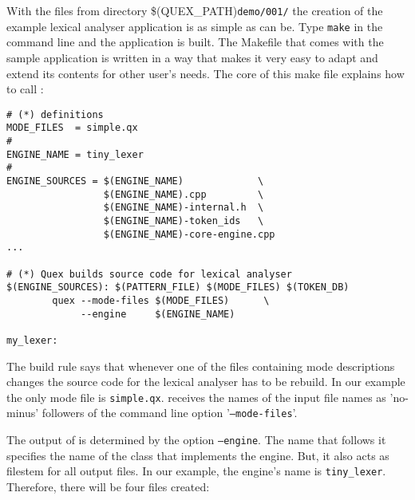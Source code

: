 With the files from directory \$(QUEX\_PATH){\tt demo/001/} the creation of the
example lexical analyser application is as simple as can be. Type {\tt make}
in the command line and the application is built. The Makefile that comes with
the sample application is written in a way that makes it very easy to adapt
and extend its contents for other user's needs. The core of this make file 
explains how to call {\quex}:

\begin{samepage}
\begin{lstlisting}
# (*) definitions
MODE_FILES  = simple.qx
#
ENGINE_NAME = tiny_lexer
#
ENGINE_SOURCES = $(ENGINE_NAME)             \
                 $(ENGINE_NAME).cpp         \
                 $(ENGINE_NAME)-internal.h  \
                 $(ENGINE_NAME)-token_ids   \
                 $(ENGINE_NAME)-core-engine.cpp
...

# (*) Quex builds source code for lexical analyser
$(ENGINE_SOURCES): $(PATTERN_FILE) $(MODE_FILES) $(TOKEN_DB)
        quex --mode-files $(MODE_FILES)      \
             --engine     $(ENGINE_NAME)

my_lexer: 
\end{lstlisting}
\end{samepage}

The build rule says that whenever one of the files containing mode descriptions
changes the source code for the lexical analyser has to be rebuild. In our
example the only mode file is {\tt simple.qx}. {\Quex} receives the names of the 
input file names as 'no-minus' followers of the command line option 
'{\tt --mode-files}'.

The output of {\quex} is determined by the option {\tt --engine}. The name
that follows it specifies the name of the class that implements the engine.
But, it also acts as filestem for all output files. In our example, the
engine's name is {\tt tiny\_lexer}. Therefore, there will be four files
created:

